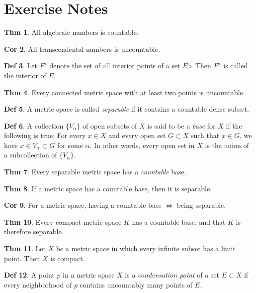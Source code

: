 \documentclass{article}
\theoremstyle{definition}
\newtheorem{definition}{Def}
\newtheorem{theorem}[definition]{Thm}
\newtheorem{corollary}[definition]{Cor}
\begin{document}
\section{Exercise Notes}
\begin{theorem}
    All algebraic numbers is countable.
\end{theorem}
\begin{corollary}
    All transcendental numbers is uncountable.
\end{corollary}
\begin{definition}
    Let $E^\circ$ denote the set of all interior points of a set $E$> Then $E^\circ$ is called the interior of $E$.
\end{definition}
\begin{theorem}
    Every connected metric space with at least two points is uncountable.
\end{theorem}
\begin{definition}
    A metric space is called \textit{separable} if it contains a countable dense subset.
\end{definition}
\begin{definition}
    A collection $\{V_\alpha\}$ of open subsets of $X$ is said to be a \textit{base} for $X$ if the following is true: For every $x\in X$ and every open set $G\subset X$ such that $x\in G$, we have $x\in V_\alpha \subset G$ for some $\alpha$. In other words, every open set in $X$ is the union of a subcollection of $\{V_\alpha\}$.
\end{definition}
\begin{theorem}
    Every separable metric space has a \textit{countable} base.
\end{theorem}
\begin{theorem}
    If a metric space has a countable base, then it is separable.
\end{theorem}
\begin{corollary}
    For a metric space, having a countable base $\iff$ being separable.
\end{corollary}
\begin{theorem}
    Every compact metric space $K$ has a countable base, and that $K$ is therefore separable.
\end{theorem}
\begin{theorem}
    Let $X$ be a metric space in which every infinite subset has a limit point. Then $X$ is compact.
\end{theorem}
\begin{definition}
    A point $p$ in a metric space $X$ is a \textit{condensation point} of a set $E\subset X$ if every neighborhood of $p$ contains uncountably many points of $E$.
\end{definition}
\end{document}
